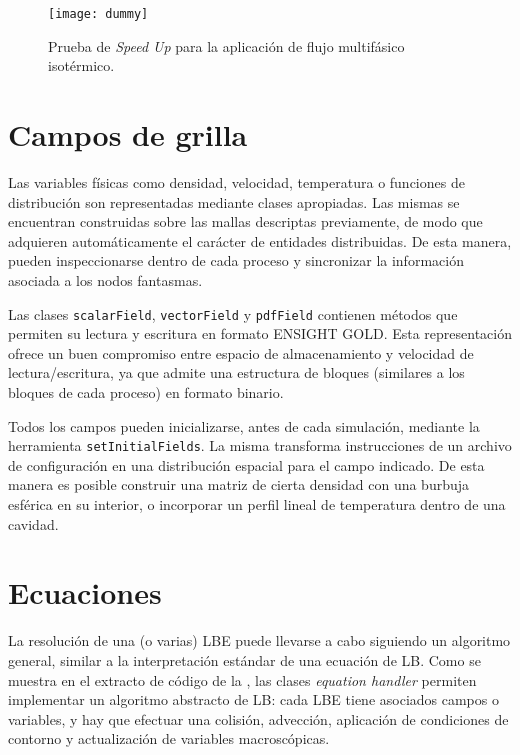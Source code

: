 \begin{figure}[ht]
	\centering
	\texttt{[image: dummy]}
	\caption{Prueba de \emph{Speed Up} para la aplicaci\'on de flujo multif\'asico isot\'ermico.}
	\label{fig:speedup_cpu}
\end{figure}




\section{Campos de grilla}

Las variables f\'isicas como densidad, velocidad, temperatura o funciones de distribuci\'on son representadas mediante clases apropiadas. Las mismas se encuentran construidas sobre las mallas descriptas previamente, de modo que adquieren autom\'aticamente el car\'acter de entidades distribuidas. De esta manera, pueden inspeccionarse dentro de cada proceso y sincronizar la informaci\'on asociada a los nodos fantasmas.

Las clases \texttt{scalarField}, \texttt{vectorField} y \texttt{pdfField} contienen m\'etodos que permiten su lectura y escritura en formato ENSIGHT GOLD. Esta representaci\'on ofrece un buen compromiso entre espacio de almacenamiento y velocidad de lectura/escritura, ya que admite una estructura de bloques (similares a los bloques de cada proceso) en formato binario.

Todos los campos pueden inicializarse, antes de cada simulaci\'on, mediante la herramienta \texttt{setInitialFields}. La misma transforma instrucciones de un archivo de configuraci\'on en una distribuci\'on espacial para el campo indicado. De esta manera es posible construir una matriz de cierta densidad con una burbuja esf\'erica en su interior, o incorporar un perfil lineal de temperatura dentro de una cavidad.



\section{Ecuaciones}

La resoluci\'on de una (o varias) LBE puede llevarse a cabo siguiendo un algoritmo general, similar a la interpretaci\'on est\'andar de una ecuaci\'on de LB. Como se muestra en el extracto de c\'odigo de la , las clases \emph{equation handler} permiten implementar un algoritmo abstracto de LB: cada LBE tiene asociados campos o variables, y hay que efectuar una colisi\'on, advecci\'on, aplicaci\'on de condiciones de contorno y actualizaci\'on de variables macrosc\'opicas.

